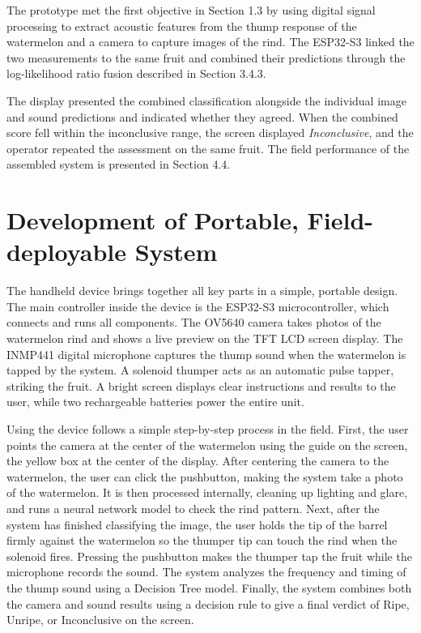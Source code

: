 \begin{thesisprose}
The prototype met the first objective in Section 1.3 by using digital signal processing to extract acoustic features from the thump response of the watermelon and a camera to capture images of the rind. The ESP32-S3 linked the two measurements to the same fruit and combined their predictions through the log-likelihood ratio fusion described in Section 3.4.3.

The display presented the combined classification alongside the individual image and sound predictions and indicated whether they agreed. When the combined score fell within the inconclusive range, the screen displayed \textit{Inconclusive}, and the operator repeated the assessment on the same fruit. The field performance of the assembled system is presented in Section 4.4.

\section{Development of Portable, Field-deployable System}

The handheld device brings together all key parts in a simple, portable design. The main controller inside the device is the ESP32-S3 microcontroller, which connects and runs all components. The OV5640 camera takes photos of the watermelon rind and shows a live preview on the TFT LCD screen display. The INMP441 digital microphone captures the thump sound when the watermelon is tapped by the system. A solenoid thumper acts as an automatic pulse tapper, striking the fruit. A bright screen displays clear instructions and results to the user, while two rechargeable batteries power the entire unit.

Using the device follows a simple step-by-step process in the field. First, the user points the camera at the center of the watermelon using the guide on the screen, the yellow box at the center of the display. After centering the camera to the watermelon, the user can click the pushbutton, making the system take a photo of the watermelon. It is then processed internally, cleaning up lighting and glare, and runs a neural network model to check the rind pattern. Next, after the system has finished classifying the image, the user holds the tip of the barrel firmly against the watermelon so the thumper tip can touch the rind when the solenoid fires. Pressing the pushbutton makes the thumper tap the fruit while the microphone records the sound. The system analyzes the frequency and timing of the thump sound using a Decision Tree model. Finally, the system combines both the camera and sound results using a decision rule to give a final verdict of Ripe, Unripe, or Inconclusive on the screen.


\end{thesisprose}
